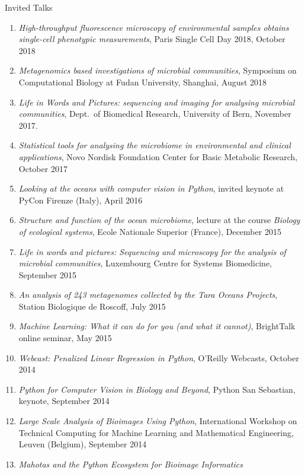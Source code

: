 \documentclass{article}
\renewcommand\subsection[1]{%
    \par\vspace{.1em}%
    {\hspace{1em}\subsubhead #1}%
    \par\vspace{.2em}%
}
\begin{document}
\subsection{Invited Talks}
\begin{enumerate}
\item \emph{High-throughput fluorescence microscopy of environmental samples
    obtains single-cell phenotypic measurements}, Paris Single Cell Day 2018,
    October 2018
\item \emph{Metagenomics based investigations of microbial communities},
    Symposium on Computational Biology at Fudan University, Shanghai, August
    2018
\item \emph{Life in Words and Pictures: sequencing and imaging for analysing
    microbial communities}, Dept.\ of Biomedical Research, University of Bern,
    November 2017.
\item \emph{Statistical tools for analysing the microbiome in environmental and
    clinical applications}, Novo Nordisk Foundation Center for Basic Metabolic
    Research, October 2017
\item \emph{Looking at the oceans with computer vision in Python}, invited
    keynote at PyCon Firenze (Italy), April 2016
\item \emph{Structure and function of the ocean microbiome}, lecture at the
    course \textit{Biology of ecological systems}, Ecole Nationale Superior
    (France), December 2015
\item \emph{Life in words and pictures: Sequencing and microscopy for the analysis
    of microbial communities}, Luxembourg Centre for Systems Biomedicine,
    September 2015
\item \emph{An analysis of 243 metagenomes collected by the Tara Oceans
    Projects}, Station Biologique de Roscoff, July 2015
\item \emph{Machine Learning: What it can do for you (and what it cannot)},
    BrightTalk online seminar, May 2015
\item \emph{Webcast: Penalized Linear Regression in Python}, O'Reilly Webcasts,
    October 2014
\item \emph{Python for Computer Vision in Biology and Beyond}, Python San
    Sebastian, keynote, September 2014
\item \emph{Large Scale Analysis of Bioimages Using Python}, International
    Workshop on Technical Computing for Machine Learning and Mathematical
    Engineering, Leuven (Belgium), September 2014
\item \emph{Mahotas and the Python Ecosystem for Bioimage Informatics
}
\end{enumerate}
\end{document}
